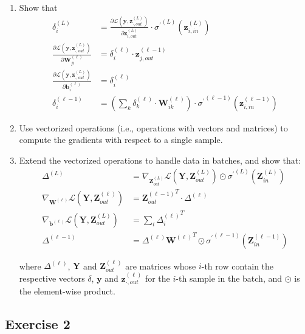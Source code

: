 \documentclass[
  a4paper,
]{article}
\begin{document}
\begin{enumerate}
\item Show that
\begin{align}
\delta^{(L)}_i &= \frac{\partial\mathcal{L}(\textbf{y},\textbf{z}^{(L)}_{\cdot,out})}{\partial\textbf{z}^{(L)}_{i,out}}
\cdot{\sigma^\prime}^{(L)}(\textbf{z}^{(L)}_{i,in})
\\
\label{eq:dldwji}
\frac{\partial \mathcal{L}(\textbf{y},\textbf{z}^{(L)}_{\cdot,out})}{\partial \textbf{W}^{(\ell)}_{ji}}&=\delta^{(\ell)}_i\cdot\textbf{z}^{(\ell-1)}_{j,out} \\
\frac{\partial \mathcal{L}(\textbf{y},\textbf{z}^{(L)}_{\cdot,out})}{\partial \textbf{b}^{(\ell)}_{i}}&=\delta^{(\ell)}_i \\
\label{eq:deltas}
\delta^{(\ell-1)}_i&=\left(\sum_k\delta^{(\ell)}_k\cdot\textbf{W}^{(\ell)}_{ik}\right)\cdot{\sigma^\prime}^{(\ell-1)}(\textbf{z}^{(\ell-1)}_{i,in})
\end{align}

\item Use vectorized operations (i.e., operations with vectors and matrices) to compute the gradients with respect to a single sample.

\item Extend the vectorized operations to handle data in batches, and show that:
\begin{align}
\Delta^{(L)}&=\nabla_{\textbf{Z}^{(L)}_{out}}\mathcal{L}(\textbf{Y},\textbf{Z}^{(L)}_{out})\odot{\sigma^\prime}^{(L)}(\textbf{Z}^{(L)}_{in}) \\
\nabla_{\textbf{W}^{(\ell)}}\mathcal{L}(\textbf{Y},\textbf{Z}^{(\ell)}_{out})&={\textbf{Z}^{(\ell-1)}_{out}}^T \cdot\Delta^{(\ell)} \\
\nabla_{\textbf{b}^{(\ell)}}\mathcal{L}(\textbf{Y},\textbf{Z}^{(L)}_{out})&=\sum_i {\Delta^{(\ell)}_i}^T \\
\Delta^{(\ell-1)}&=\Delta^{(\ell)}{\textbf{W}^{(\ell)}}^T\odot{\sigma^\prime}^{(\ell-1)}(\textbf{Z}^{(\ell-1)}_{in})
\end{align}

where $\Delta^{(\ell)}$, $\textbf{Y}$ and $\textbf{Z}^{(\ell)}_{out}$ are matrices whose $i$-th row contain the respective vectors $\delta$, $\textbf{y}$ and $\textbf{z}^{(\ell)}_{\cdot,out}$ for the $i$-th sample in the batch, and $\odot$ is the element-wise product.
\end{enumerate}

\hypertarget{exercise-2}{%
\subsection{Exercise 2}\label{exercise-2}}
\end{document}
